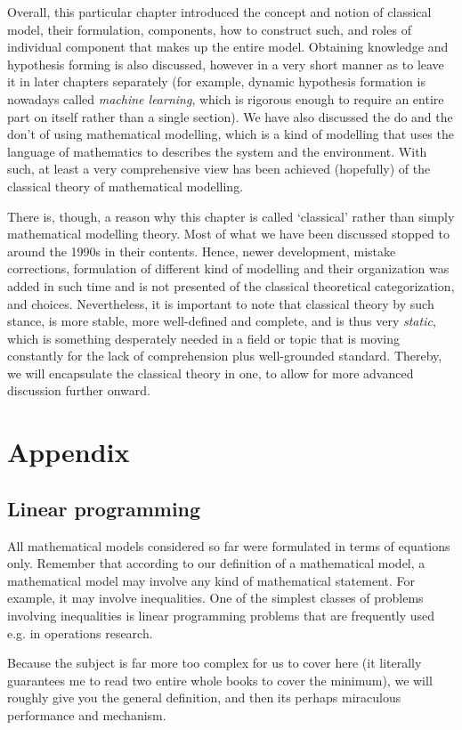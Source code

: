 Overall, this particular chapter introduced the concept and notion of classical model, their formulation, components, how to construct such, and roles of individual component that makes up the entire model. Obtaining knowledge and hypothesis forming is also discussed, however in a very short manner as to leave it in later chapters separately (for example, dynamic hypothesis formation is nowadays called \textit{machine learning}, which is rigorous enough to require an entire part on itself rather than a single section). We have also discussed the do and the don't of using mathematical modelling, which is a kind of modelling that uses the language of mathematics to describes the system and the environment. With such, at least a very comprehensive view has been achieved (hopefully) of the classical theory of mathematical modelling. 

There is, though, a reason why this chapter is called `classical' rather than simply mathematical modelling theory. Most of what we have been discussed stopped to around the 1990s in their contents. Hence, newer development, mistake corrections, formulation of different kind of modelling and their organization was added in such time and is not presented of the classical theoretical categorization, and choices. Nevertheless, it is important to note that classical theory by such stance, is more stable, more well-defined and complete, and is thus very \textit{static}, which is something desperately needed in a field or topic that is moving constantly for the lack of comprehension plus well-grounded standard. Thereby, we will encapsulate the classical theory in one, to allow for more advanced discussion further onward. 

\section{Appendix}
\subsection{Linear programming}
All mathematical models considered so far were formulated in terms of equations only. Remember that according to our definition of a mathematical model, a mathematical model may involve any kind of mathematical statement. For example, it may involve inequalities. One of the simplest classes of problems involving inequalities is linear programming problems that are frequently used e.g. in operations research.

Because the subject is far more too complex for us to cover here (it literally guarantees me to read two entire whole books to cover the minimum), we will roughly give you the general definition, and then its perhaps miraculous performance and mechanism. 

